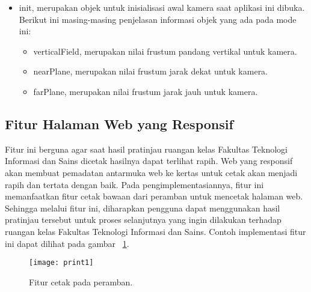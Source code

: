 \begin{itemize}
\begin{itemize}
\begin{itemize}
			\end{itemize}
			\item init, merupakan objek untuk inisialisasi awal kamera saat aplikasi ini dibuka. Berikut ini masing-masing penjelasan informasi objek yang ada pada mode ini:
			\begin{itemize}
				\item verticalField, merupakan nilai frustum pandang vertikal untuk kamera.
				\item nearPlane, merupakan nilai frustum jarak dekat untuk kamera.
				\item farPlane, merupakan nilai frustum jarak jauh untuk kamera.
			\end{itemize}
		\end{itemize}
\end{itemize}

\subsection{Fitur Halaman Web yang Responsif}
\label{sec:fiturcetakhasil}
Fitur ini berguna agar saat hasil pratinjau ruangan kelas Fakultas Teknologi Informasi dan Sains dicetak hasilnya dapat terlihat rapih. Web yang responsif akan membuat pemadatan antarmuka web ke kertas untuk cetak akan menjadi rapih dan tertata dengan baik. Pada pengimplementasiannya, fitur ini memanfaatkan fitur cetak bawaan dari peramban untuk mencetak halaman web. Sehingga melalui fitur ini, diharapkan pengguna dapat menggunakan hasil pratinjau tersebut untuk proses selanjutnya yang ingin dilakukan terhadap ruangan kelas Fakultas Teknologi Informasi dan Sains. Contoh implementasi fitur ini dapat dilihat pada gambar ~\ref{fig:print}.
\begin{figure}[!hb]
	\centering
	\texttt{[image: print1]}
	\caption{Fitur cetak pada peramban.}
	\label{fig:print}
	\vspace{8mm}
\end{figure}
















